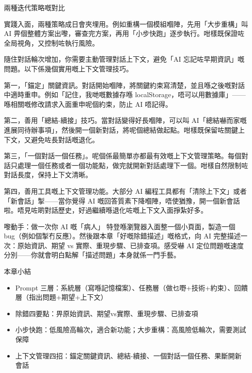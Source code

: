 \begin{center}\small\color{gray}兩種迭代策略嘅對比\end{center}

實踐入面，兩種策略成日會夾埋用。例如重構一個模組嗰陣，先用「大步重構」叫 AI 畀個整體方案出嚟，審查完方案，再用「小步快跑」逐步執行。咁樣既保證咗全局視角，又控制咗執行風險。


隨住對話輪次增加，你需要主動管理對話上下文，避免「AI 忘記咗早期資訊」嘅問題。以下係幾個實用嘅上下文管理技巧。

第一，「錨定」關鍵資訊。對話開始嗰陣，將關鍵約束寫清楚，並且喺之後嘅對話中適時重申。例如「記住，我哋嘅數據存喺 localStorage，唔可以用數據庫」——喺相關嘅修改請求入面重申呢個約束，防止 AI 唔記得。

第二，善用「總結-續接」技巧。當對話變得好長嗰陣，可以叫 AI「總結嚇而家嘅進展同待辦事項」，然後開一個新對話，將呢個總結做起點。咁樣既保留咗關鍵上下文，又避免咗長對話嘅退化。

第三，「一個對話一個任務」。呢個係最簡單亦都最有效嘅上下文管理策略。每個對話只處理一個任務或者一個功能點，做完就開新對話處理下一個。咁樣自然限制咗對話長度，保持上下文清晰。

第四，善用工具嘅上下文管理功能。大部分 AI 編程工具都有「清除上下文」或者「新會話」掣——當你覺得 AI 嘅回答質素下降嗰陣，唔使猶豫，開一個新會話啦。唔見咗啲對話歷史，好過繼續喺退化咗嘅上下文入面掙紮好多。

\begin{tcbpractice}{嚟動手：做一次你 AI 嘅「病人」}
特登喺瀏覽器入面整一個小頁面，製造一個 bug（例如個掣冇反應）。然後跟本章「好嘅除錯描述」嘅格式，向 AI 完整描述一次：原始資訊、期望 vs 實際、重現步驟、已排查項。感受嚇 AI 定位問題嘅速度分別——你就會明白點解「描述問題」本身就係一門手藝。

\end{tcbpractice}

\begin{tcbsummary}{本章小結}
\begin{itemize}
  \item Prompt 三層：系統層（寫喺記憶檔案）、任務層（做乜嘢+技術+約束）、回饋層（指出問題+期望+上下文）
  \item 除錯四要點：畀原始資訊、期望vs實際、重現步驟、已排查項
  \item 小步快跑：低風險高輪次，適合新功能；大步重構：高風險低輪次，需要測試保障
  \item 上下文管理四招：錨定關鍵資訊、總結-續接、一個對話一個任務、果斷開新會話
\end{itemize}

\end{tcbsummary}
